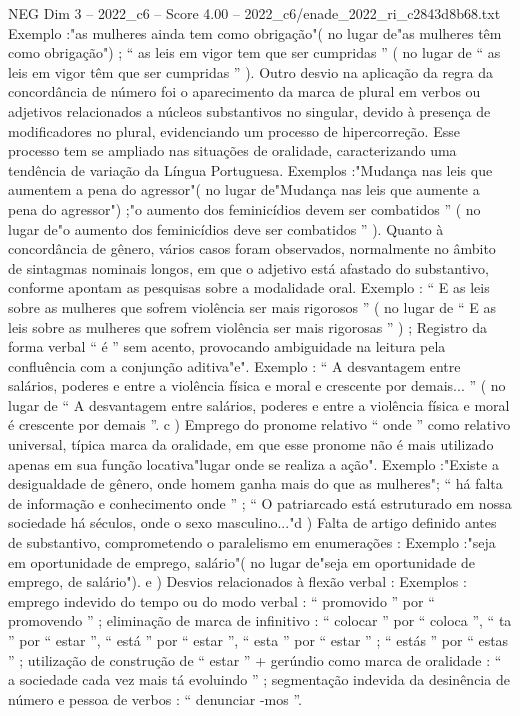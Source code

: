 \begin{textsample}{NEG Dim 3 – 2022\_c6 – Score 4.00 – 2022\_c6/enade\_2022\_ri\_c2843d8b68.txt}
Exemplo :"as mulheres ainda tem como obrigação"( no lugar de"as mulheres têm como obrigação") ; “ as leis em vigor tem que ser cumpridas ” ( no lugar de “ as leis em vigor têm que ser cumpridas ” ).
Outro desvio na aplicação da regra da concordância de número foi o aparecimento da marca de plural em verbos ou adjetivos relacionados a núcleos substantivos no singular, devido à presença de modificadores no plural, evidenciando um processo de hipercorreção.
Esse processo tem se ampliado nas situações de oralidade, caracterizando uma tendência de variação da Língua Portuguesa.
Exemplos :"Mudança nas leis que aumentem a pena do agressor"( no lugar de"Mudança nas leis que aumente a pena do agressor") ;"o aumento dos feminicídios devem ser combatidos ” ( no lugar de"o aumento dos feminicídios deve ser combatidos ” ).
Quanto à concordância de gênero, vários casos foram observados, normalmente no âmbito de sintagmas nominais longos, em que o adjetivo está afastado do substantivo, conforme apontam as pesquisas sobre a modalidade oral.
Exemplo : “ E as leis sobre as mulheres que sofrem violência ser mais rigorosos ” ( no lugar de “ E as leis sobre as mulheres que sofrem violência ser mais rigorosas ” ) ; Registro da forma verbal “ é ” sem acento, provocando ambiguidade na leitura pela confluência com a conjunção aditiva"e".
Exemplo : “ A desvantagem entre salários, poderes e entre a violência física e moral e crescente por demais... ” ( no lugar de “ A desvantagem entre salários, poderes e entre a violência física e moral é crescente por demais ”. c ) Emprego do pronome relativo “ onde ” como relativo universal, típica marca da oralidade, em que esse pronome não é mais utilizado apenas em sua função locativa"lugar onde se realiza a ação".
Exemplo :"Existe a desigualdade de gênero, onde homem ganha mais do que as mulheres"; “ há falta de informação e conhecimento onde ” ; “ O patriarcado está estruturado em nossa sociedade há séculos, onde o sexo masculino..."d ) Falta de artigo definido antes de substantivo, comprometendo o paralelismo em enumerações : Exemplo :"seja em oportunidade de emprego, salário"( no lugar de"seja em oportunidade de emprego, de salário"). e ) Desvios relacionados à flexão verbal : Exemplos : emprego indevido do tempo ou do modo verbal : “ promovido ” por “ promovendo ” ; eliminação de marca de infinitivo : “ colocar ” por “ coloca ”, “ ta ” por “ estar ”, “ está ” por “ estar ”, “ esta ” por “ estar ” ; “ estás ” por “ estas ” ; utilização de construção de “ estar ” + gerúndio como marca de oralidade : “ a sociedade cada vez mais tá evoluindo ” ; segmentação indevida da desinência de número e pessoa de verbos : “ denunciar -mos ”.

\end{textsample}
